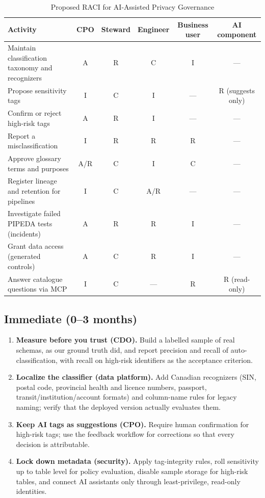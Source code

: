 \documentclass[journal,onecolumn,11pt]{IEEEtran}
\begin{document}
\begin{table}[!t]
\caption{Proposed RACI for AI-Assisted Privacy Governance}
\label{tab:raci}
\centering\footnotesize
\begin{tabular}{lccccc}
\toprule
\textbf{Activity} & \textbf{CPO} & \textbf{Steward} & \textbf{Engineer} & \textbf{Business user} & \textbf{AI component} \\
\midrule
Maintain classification taxonomy and recognizers & A & R & C & I & --- \\
Propose sensitivity tags & I & C & I & --- & R (suggests only) \\
Confirm or reject high-risk tags & A & R & I & --- & --- \\
Report a misclassification & I & R & R & R & --- \\
Approve glossary terms and purposes & A/R & C & I & C & --- \\
Register lineage and retention for pipelines & I & C & A/R & --- & --- \\
Investigate failed PIPEDA tests (incidents) & A & R & R & I & --- \\
Grant data access (generated controls) & A & C & R & I & --- \\
Answer catalogue questions via MCP & I & C & --- & R & R (read-only) \\
\bottomrule
\end{tabular}
\end{table}

\subsection{Immediate (0--3 months)}
\begin{enumerate}
\item \textbf{Measure before you trust (CDO).} Build a labelled sample of real schemas, as our ground truth did, and report precision and recall of auto-classification, with recall on high-risk identifiers as the acceptance criterion.
\item \textbf{Localize the classifier (data platform).} Add Canadian recognizers (SIN, postal code, provincial health and licence numbers, passport, transit/institution/account formats) and column-name rules for legacy naming; verify that the deployed version actually evaluates them.
\item \textbf{Keep AI tags as suggestions (CPO).} Require human confirmation for high-risk tags; use the feedback workflow for corrections so that every decision is attributable.
\item \textbf{Lock down metadata (security).} Apply tag-integrity rules, roll sensitivity up to table level for policy evaluation, disable sample storage for high-risk tables, and connect AI assistants only through least-privilege, read-only identities.
\end{enumerate}
\end{document}
